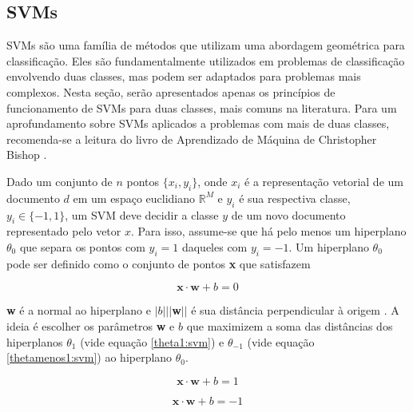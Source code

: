 \subsection{SVMs}
\label{subsection:SVMs}

SVMs são uma família de métodos que utilizam uma abordagem geométrica para classificação. Eles são fundamentalmente utilizados em problemas de classificação envolvendo duas classes, mas podem ser adaptados para problemas mais complexos. Nesta seção, serão apresentados apenas os princípios de funcionamento de SVMs para duas classes, mais comuns na literatura. Para um aprofundamento sobre SVMs aplicados a problemas com mais de duas classes, recomenda-se a leitura do livro de Aprendizado de Máquina de Christopher Bishop \cite{bishop}.

Dado um conjunto de \ensuremath{n} pontos \ensuremath{\{x_i, y_i\}}, onde \ensuremath{x_i} é a representação vetorial de um documento \ensuremath{d} em um espaço euclidiano \ensuremath{\mathbb{R}^M} e \ensuremath{y_i} é sua respectiva classe, \ensuremath{y_i \in \{-1, 1\}}, um SVM deve decidir a classe \ensuremath{y} de um novo documento representado pelo vetor \ensuremath{x}. Para isso, assume-se que há pelo menos um hiperplano \ensuremath{\theta_0} que separa os pontos  com \ensuremath{y_i = 1} daqueles com \ensuremath{y_i = -1}. Um hiperplano \ensuremath{\theta_0} pode ser definido como o conjunto de pontos \textbf{x} que satisfazem

\begin{equation}
\label{function:svm}
\textbf{x} \ensuremath{\cdot} \textbf{w} + \ensuremath{b} = 0
\end{equation}

\textbf{w} é a normal ao hiperplano e \ensuremath{|b|||}\textbf{w}\ensuremath{||} é sua distância perpendicular à origem \cite{mono-puc}. A ideia é escolher os parâmetros \textbf{w} e \ensuremath{b} que maximizem a soma das distâncias dos hiperplanos \ensuremath{\theta_1} (vide equação \ref{theta1:svm}) e \ensuremath{\theta_{-1}} (vide equação \ref{thetamenos1:svm}) ao hiperplano \ensuremath{\theta_0}. 

\begin{equation}
\label{theta1:svm}
\textbf{x} \ensuremath{\cdot} \textbf{w} + \ensuremath{b} = 1
\end{equation}

\begin{equation}
\label{thetamenos1:svm}
\textbf{x} \ensuremath{\cdot} \textbf{w} + \ensuremath{b} = -1
\end{equation}


